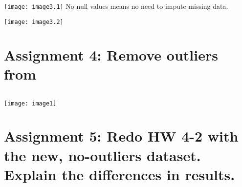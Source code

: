 \documentclass[]{article}
\begin{document}
\texttt{[image: image3.1]}
No null values means no need to impute missing data.

\texttt{[image: image3.2]}


\section*{Assignment 4: Remove outliers from }

\begin{verbatim}

\end{verbatim}
\texttt{[image: image1]}




\section*{Assignment 5: Redo HW 4-2 with the new, no-outliers dataset. Explain the differences in results.}
\end{document}
